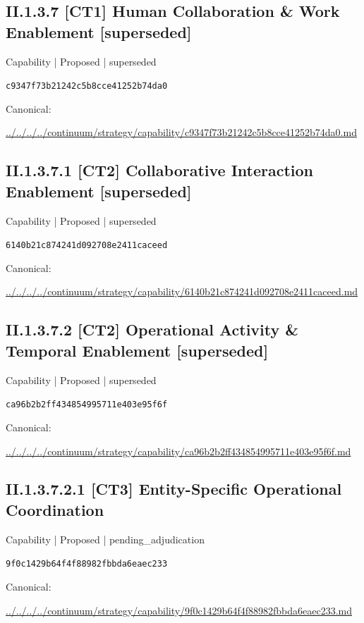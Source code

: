 \documentclass[10pt,a4paper]{article}
\begin{document}
\subsection*{II.1.3.7 [CT1] Human Collaboration \& Work Enablement [superseded]}
\label{element-c9347f73b21242c5b8cce41252b74da0}
{\small Capability | Proposed | superseded}\par
\texttt{c9347f73b21242c5b8cce41252b74da0}\par
Canonical: \par
{\footnotesize\url{../../../../continuum/strategy/capability/c9347f73b21242c5b8cce41252b74da0.md}}\par
\subsection*{II.1.3.7.1 [CT2] Collaborative Interaction Enablement [superseded]}
\label{element-6140b21c874241d092708e2411caceed}
{\small Capability | Proposed | superseded}\par
\texttt{6140b21c874241d092708e2411caceed}\par
Canonical: \par
{\footnotesize\url{../../../../continuum/strategy/capability/6140b21c874241d092708e2411caceed.md}}\par
\subsection*{II.1.3.7.2 [CT2] Operational Activity \& Temporal Enablement [superseded]}
\label{element-ca96b2b2ff434854995711e403e95f6f}
{\small Capability | Proposed | superseded}\par
\texttt{ca96b2b2ff434854995711e403e95f6f}\par
Canonical: \par
{\footnotesize\url{../../../../continuum/strategy/capability/ca96b2b2ff434854995711e403e95f6f.md}}\par
\subsection*{II.1.3.7.2.1 [CT3] Entity-Specific Operational Coordination}
\label{element-9f0c1429b64f4f88982fbbda6eaec233}
{\small Capability | Proposed | pending\_adjudication}\par
\texttt{9f0c1429b64f4f88982fbbda6eaec233}\par
Canonical: \par
{\footnotesize\url{../../../../continuum/strategy/capability/9f0c1429b64f4f88982fbbda6eaec233.md}}\par
\end{document}
